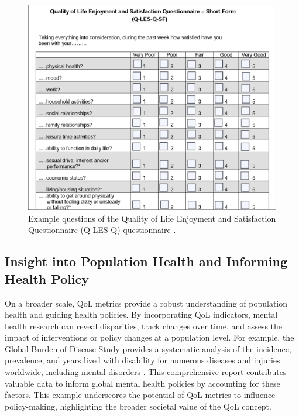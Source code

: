 \documentclass[10pt]{article}
\begin{document}
\begin{sloppypar}
  \begin{figure}[ht]
    \centering
    \includegraphics[width=\textwidth]{figures/q-les.png}
    \caption[Example questions of the Quality of Life Enjoyment and Satisfaction Questionnaire (Q-LES-Q) questionnaire.]{Example questions of the Quality of Life Enjoyment and Satisfaction Questionnaire (Q-LES-Q) questionnaire \citep{endicott_quality_1993}.}
    \label{fig:q-les}
  \end{figure}

  \subsection{Insight into Population Health and Informing Health Policy}
  \label{subsec:population-health}
  On a broader scale, QoL metrics provide a robust understanding of population health and guiding health policies. By incorporating QoL indicators, mental health research can reveal disparities, track changes over time, and assess the impact of interventions or policy changes at a population level.
  For example, the Global Burden of Disease Study \citeyearpar{gbd_2017_disease_and_injury_incidence_and_prevalence_collaborators_global_2018} provides a systematic analysis of the incidence, prevalence, and years lived with disability for numerous diseases and injuries worldwide, including mental disorders \citep{gbd_2017_disease_and_injury_incidence_and_prevalence_collaborators_global_2018}. This comprehensive report contributes valuable data to inform global mental health policies by accounting for these factors. This example underscores the potential of QoL metrics to influence policy-making, highlighting the broader societal value of the QoL concept.


\end{sloppypar}
\end{document}
